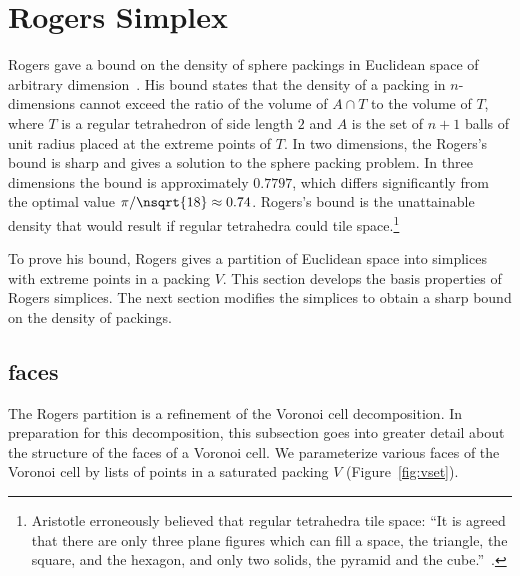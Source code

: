 \section{Rogers Simplex}\label{sec:rogers}

%
%


Rogers gave a bound on the density of sphere packings in Euclidean
space of arbitrary dimension~\cite{Rogers:1958:Packing}.  His bound
states that the density of a packing in $n$-dimensions cannot exceed
the ratio of the volume of $A \cap T$ to the volume of $T$, where $T$
is a regular tetrahedron of side length $2$ and $A$ is the set of
$n+1$ balls of unit radius placed at the extreme points of $T$.  In two
dimensions, the Rogers's bound is sharp and gives a solution to the
sphere packing problem.  In three dimensions the bound is
approximately $0.7797$, which differs significantly from the optimal
value $\pi/\nsqrt{18}\approx 0.74$.  Rogers's bound is the unattainable
density that would result if regular tetrahedra could tile
space.\footnote{Aristotle erroneously believed that regular tetrahedra
  tile space: ``It is agreed that there are only three plane figures
  which can fill a space, the triangle, the square, and the hexagon,
  and only two solids, the pyramid and the cube.''~\cite{Aristotle}.}
%
%
%

To prove his bound, Rogers gives a partition of Euclidean space into
simplices with extreme points in a packing $V$.  This section develops
the basis properties of Rogers simplices.  The next section modifies
the simplices to obtain a sharp bound on the density of packings.




\subsection{faces}

The Rogers partition is a refinement of the Voronoi cell decomposition.
In preparation for this decomposition, this subsection goes into
greater detail about the structure of the faces of a Voronoi cell.  We
parameterize various faces of the Voronoi cell by lists of points in a
saturated packing $V$ (Figure~\ref{fig:vset}).

